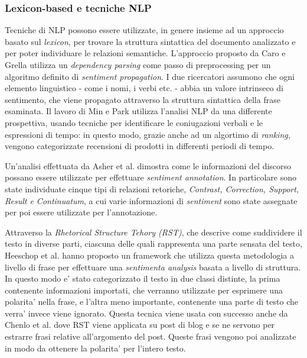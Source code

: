 \documentclass[a4paper,12pt,openright,twoside]{report}
\theoremstyle{definition}
\begin{document}
\subsubsection{Lexicon-based e tecniche NLP}
Tecniche di NLP possono essere utilizzate, in genere insieme ad un approccio basato sul \emph{lexicon}, per 
trovare la struttura sintattica del documento analizzato e per poter individuare le relazioni semantiche.
L'approccio proposto da Caro e Grella %
utilizza un \emph{dependency parsing} come passo di preprocessing per un algoritmo definito di \emph{sentiment propagation}.
I due ricercatori assumono che ogni elemento linguistico - come i nomi, i verbi etc. - abbia un valore intrinseco di
sentimento, che viene propagato attraverso la struttura sintattica della frase esaminata.
Il lavoro di Min e Park %
utilizza l'analisi NLP da una differente prospettiva, usando tecniche per identificare le coniugazioni
verbali e le espressioni di tempo: in questo modo, grazie anche ad un algortimo di \emph{ranking}, vengono categorizzate
recensioni di prodotti in differenti periodi di tempo.

Un'analisi effettuata da Asher et al. %
dimostra come le informazioni del discorso possano essere utilizzate per effettuare \emph{sentiment annotation}. In particolare
sono state individuate cinque tipi di relazioni retoriche, \emph{Contrast, Correction, Support, Result e Continuatum},
a cui varie informazioni di \emph{sentiment} sono state assegnate per poi essere utilizzate per l'annotazione.

Attraverso la \emph{Rhetorical Structure Tehory (RST)}, che descrive come suddividere il testo in diverse parti, ciascuna
delle quali rappresenta una parte sensata del testo, Heeschop et al. %
hanno proposto un framework che utilizza questa metodologia  a livello di frase per effettuare una \emph{sentimenta analysis}
basata a livello di struttura. In questo modo e' stato categorizzato il testo in due classi distinte, la prima
contenente
informazioni importati, che verranno utilizzate per esprimere una polarita' nella frase, e l'altra 
meno importante, contenente una parte di testo che verra'
invece viene ignorato.
Questa tecnica viene usata con successo anche da Chenlo et al. %
dove RST viene applicata su post di blog e se ne servono per estrarre frasi relative all'argomento del post. Queste frasi
vengono poi analizzate in modo da ottenere la polarita' per l'intero testo.
\end{document}
